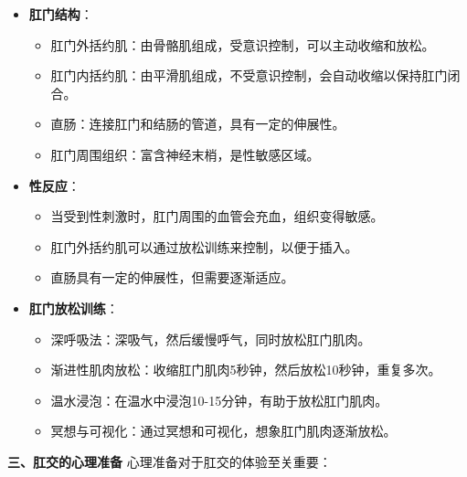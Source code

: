 \documentclass[12pt,UTF8]{ctexbook}
\begin{document}
\begin{itemize}
	\item \textbf{肛门结构}：
	\begin{itemize}
		\item 肛门外括约肌：由骨骼肌组成，受意识控制，可以主动收缩和放松。
		\item 肛门内括约肌：由平滑肌组成，不受意识控制，会自动收缩以保持肛门闭合。
		\item 直肠：连接肛门和结肠的管道，具有一定的伸展性。
		\item 肛门周围组织：富含神经末梢，是性敏感区域。
	\end{itemize}
	\item \textbf{性反应}：
	\begin{itemize}
		\item 当受到性刺激时，肛门周围的血管会充血，组织变得敏感。
		\item 肛门外括约肌可以通过放松训练来控制，以便于插入。
		\item 直肠具有一定的伸展性，但需要逐渐适应。
	\end{itemize}
	\item \textbf{肛门放松训练}：
	\begin{itemize}
		\item 深呼吸法：深吸气，然后缓慢呼气，同时放松肛门肌肉。
		\item 渐进性肌肉放松：收缩肛门肌肉5秒钟，然后放松10秒钟，重复多次。
		\item 温水浸泡：在温水中浸泡10-15分钟，有助于放松肛门肌肉。
		\item 冥想与可视化：通过冥想和可视化，想象肛门肌肉逐渐放松。
	\end{itemize}
\end{itemize}

\textbf{三、肛交的心理准备}
心理准备对于肛交的体验至关重要：
\end{document}

